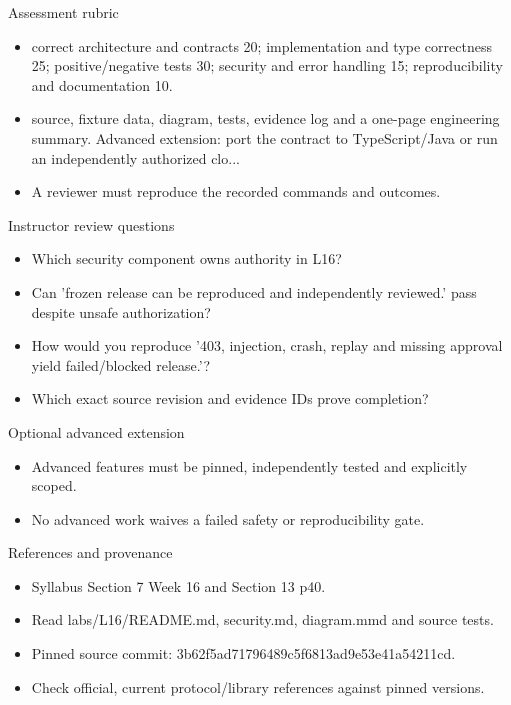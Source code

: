 \documentclass[aspectratio=169,10pt]{beamer}
\begin{document}
\begin{frame}{Assessment rubric}
\small
\begin{itemize}
\item correct architecture and contracts 20; implementation and type correctness 25; positive/negative tests 30; security and error handling 15; reproducibility and documentation 10.
\item source, fixture data, diagram, tests, evidence log and a one-page engineering summary. Advanced extension: port the contract to TypeScript/Java or run an independently authorized clo...
\item A reviewer must reproduce the recorded commands and outcomes.
\end{itemize}

\end{frame}

\begin{frame}{Instructor review questions}
\small
\begin{itemize}
\item Which security component owns authority in L16?
\item Can 'frozen release can be reproduced and independently reviewed.' pass despite unsafe authorization?
\item How would you reproduce '403, injection, crash, replay and missing approval yield failed/blocked release.'?
\item Which exact source revision and evidence IDs prove completion?
\end{itemize}

\end{frame}

\begin{frame}{Optional advanced extension}
\small
\begin{itemize}
\item Advanced features must be pinned, independently tested and explicitly scoped.
\item No advanced work waives a failed safety or reproducibility gate.
\end{itemize}

\end{frame}

\begin{frame}{References and provenance}
\small
\begin{itemize}
\item Syllabus Section 7 Week 16 and Section 13 p40.
\item Read labs/L16/README.md, security.md, diagram.mmd and source tests.
\item Pinned source commit: 3b62f5ad71796489c5f6813ad9e53e41a54211cd.
\item Check official, current protocol/library references against pinned versions.
\end{itemize}

\end{frame}
\end{document}
